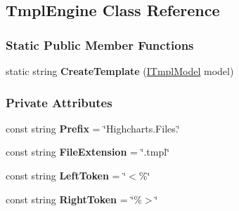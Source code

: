 \hypertarget{classHighcharts_1_1TmplEngine}{}\subsection{Tmpl\+Engine Class Reference}
\label{classHighcharts_1_1TmplEngine}
\subsubsection*{Static Public Member Functions}
\begin{DoxyCompactItemize}
\item 
\mbox{\label{classHighcharts_1_1TmplEngine_a77654540d7c9217f0d90f4624b0c77f3}} 
static string {\bfseries Create\+Template} (\hyperlink{interfaceHighcharts_1_1ITmplModel}{I\+Tmpl\+Model} model)
\end{DoxyCompactItemize}
\subsubsection*{Private Attributes}
\begin{DoxyCompactItemize}
\item 
\mbox{\label{classHighcharts_1_1TmplEngine_a6121a594f50cd69a1b661a52b7346120}} 
const string {\bfseries Prefix} = \char`\"{}Highcharts.\+Files.\char`\"{}
\item 
\mbox{\label{classHighcharts_1_1TmplEngine_a5e958797e07b0bd922b59e561f05bb1f}} 
const string {\bfseries File\+Extension} = \char`\"{}.tmpl\char`\"{}
\item 
\mbox{\label{classHighcharts_1_1TmplEngine_ae81c1612fbd57f120c2c8e649755a23a}} 
const string {\bfseries Left\+Token} = \char`\"{}$<$\%\char`\"{}
\item 
\mbox{\label{classHighcharts_1_1TmplEngine_acd06761bcd01254df6e1915c9ab2b79a}} 
const string {\bfseries Right\+Token} = \char`\"{}\%$>$\char`\"{}
\end{DoxyCompactItemize}
